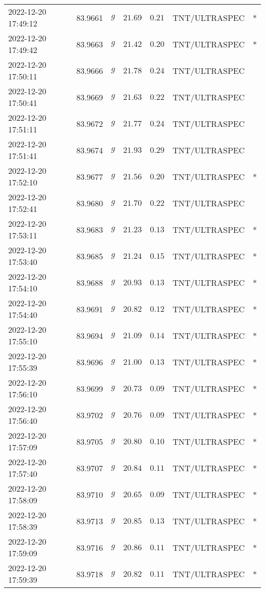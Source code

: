 \documentclass{nature_plusfigure}
\begin{document}
\begin{supplement}
\begin{center}
\begin{longtable}{lllllll}
2022-12-20 17:49:12 & 83.9661 & $g$ & $21.69$ & $0.21$ & TNT/ULTRASPEC & * \\ 
2022-12-20 17:49:42 & 83.9663 & $g$ & $21.42$ & $0.20$ & TNT/ULTRASPEC & * \\ 
2022-12-20 17:50:11 & 83.9666 & $g$ & $21.78$ & $0.24$ & TNT/ULTRASPEC &  \\ 
2022-12-20 17:50:41 & 83.9669 & $g$ & $21.63$ & $0.22$ & TNT/ULTRASPEC &  \\ 
2022-12-20 17:51:11 & 83.9672 & $g$ & $21.77$ & $0.24$ & TNT/ULTRASPEC &  \\ 
2022-12-20 17:51:41 & 83.9674 & $g$ & $21.93$ & $0.29$ & TNT/ULTRASPEC &  \\ 
2022-12-20 17:52:10 & 83.9677 & $g$ & $21.56$ & $0.20$ & TNT/ULTRASPEC & * \\ 
2022-12-20 17:52:41 & 83.9680 & $g$ & $21.70$ & $0.22$ & TNT/ULTRASPEC &  \\ 
2022-12-20 17:53:11 & 83.9683 & $g$ & $21.23$ & $0.13$ & TNT/ULTRASPEC & * \\ 
2022-12-20 17:53:40 & 83.9685 & $g$ & $21.24$ & $0.15$ & TNT/ULTRASPEC & * \\ 
2022-12-20 17:54:10 & 83.9688 & $g$ & $20.93$ & $0.13$ & TNT/ULTRASPEC & * \\ 
2022-12-20 17:54:40 & 83.9691 & $g$ & $20.82$ & $0.12$ & TNT/ULTRASPEC & * \\ 
2022-12-20 17:55:10 & 83.9694 & $g$ & $21.09$ & $0.14$ & TNT/ULTRASPEC & * \\ 
2022-12-20 17:55:39 & 83.9696 & $g$ & $21.00$ & $0.13$ & TNT/ULTRASPEC & * \\ 
2022-12-20 17:56:10 & 83.9699 & $g$ & $20.73$ & $0.09$ & TNT/ULTRASPEC & * \\ 
2022-12-20 17:56:40 & 83.9702 & $g$ & $20.76$ & $0.09$ & TNT/ULTRASPEC & * \\ 
2022-12-20 17:57:09 & 83.9705 & $g$ & $20.80$ & $0.10$ & TNT/ULTRASPEC & * \\ 
2022-12-20 17:57:40 & 83.9707 & $g$ & $20.84$ & $0.11$ & TNT/ULTRASPEC & * \\ 
2022-12-20 17:58:09 & 83.9710 & $g$ & $20.65$ & $0.09$ & TNT/ULTRASPEC & * \\ 
2022-12-20 17:58:39 & 83.9713 & $g$ & $20.85$ & $0.13$ & TNT/ULTRASPEC & * \\ 
2022-12-20 17:59:09 & 83.9716 & $g$ & $20.86$ & $0.11$ & TNT/ULTRASPEC & * \\ 
2022-12-20 17:59:39 & 83.9718 & $g$ & $20.82$ & $0.11$ & TNT/ULTRASPEC & * \\ 

\end{longtable}
\end{center}
\end{supplement}
\end{document}

